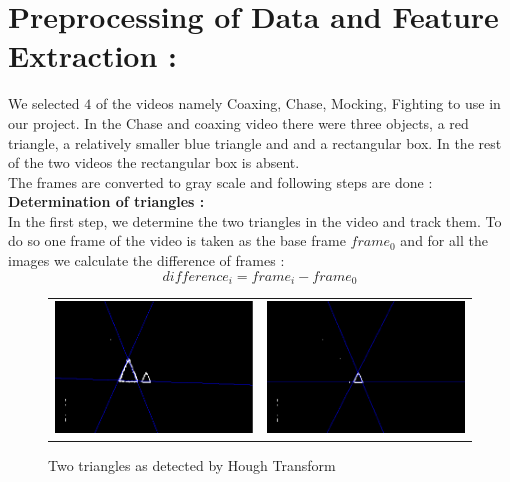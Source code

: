 \documentclass[10pt, twocolumn]{article}
\begin{document}
\section*{Preprocessing of Data and Feature Extraction : }
We selected $4$ of the videos namely Coaxing, Chase, Mocking, Fighting to use in our project. In the Chase and coaxing video there were three objects, a red triangle, a relatively smaller blue triangle and and a rectangular box. In the rest of the two videos the rectangular box is absent.\\
The frames are converted to gray scale and following steps are done :\\
{\bf Determination of triangles : }\\ \hspace*{10pt} In the first step, we determine the two triangles in the video and track them. To do so one frame of the video is taken as the base frame $frame_0$ and for all the images we calculate the difference of frames :
	$$difference_i = frame_i - frame_0$$
\begin{figure}[H]
\center
\begin{tabular}{cc}
\includegraphics[scale=0.25]{0002l.png} & 
\includegraphics[scale=0.25]{0002s.png}
\end{tabular}
\label{tab:gt}
\caption{Two triangles as detected by Hough Transform}
\end{figure}
\end{document}
